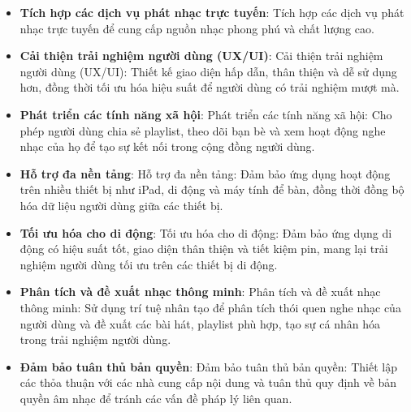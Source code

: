 \begin{itemize}
    \item \textbf{Tích hợp các dịch vụ phát nhạc trực tuyến}: Tích hợp các dịch vụ phát nhạc trực tuyến để cung cấp nguồn nhạc phong phú và chất lượng cao.
    \item \textbf{Cải thiện trải nghiệm người dùng (UX/UI)}: Cải thiện trải nghiệm người dùng (UX/UI): Thiết kế giao diện hấp dẫn, thân thiện và dễ sử dụng hơn, đồng thời tối ưu hóa hiệu suất để người dùng có trải nghiệm mượt mà.
    \item \textbf{Phát triển các tính năng xã hội}: Phát triển các tính năng xã hội: Cho phép người dùng chia sẻ playlist, theo dõi bạn bè và xem hoạt động nghe nhạc của họ để tạo sự kết nối trong cộng đồng người dùng.
    \item \textbf{Hỗ trợ đa nền tảng}: Hỗ trợ đa nền tảng: Đảm bảo ứng dụng hoạt động trên nhiều thiết bị như iPad, di động và máy tính để bàn, đồng thời đồng bộ hóa dữ liệu người dùng giữa các thiết bị.
    \item \textbf{Tối ưu hóa cho di động}: Tối ưu hóa cho di động: Đảm bảo ứng dụng di động có hiệu suất tốt, giao diện thân thiện và tiết kiệm pin, mang lại trải nghiệm người dùng tối ưu trên các thiết bị di động.
    \item \textbf{Phân tích và đề xuất nhạc thông minh}: Phân tích và đề xuất nhạc thông minh: Sử dụng trí tuệ nhân tạo để phân tích thói quen nghe nhạc của người dùng và đề xuất các bài hát, playlist phù hợp, tạo sự cá nhân hóa trong trải nghiệm người dùng.
    \item \textbf{Đảm bảo tuân thủ bản quyền}: Đảm bảo tuân thủ bản quyền: Thiết lập các thỏa thuận với các nhà cung cấp nội dung và tuân thủ quy định về bản quyền âm nhạc để tránh các vấn đề pháp lý liên quan.
\end{itemize}

